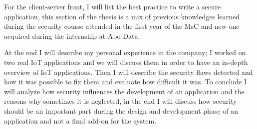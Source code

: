 	For the client-server front, I will list the best practice to write a secure application, this section of the thesis
	is a mix of previous knowledges learned during the security course attended in the first year of the MsC and new one
	acquired during the internship at Abo Data.\newline
	
	At the end I will describe my personal experience in the company; I worked on two real IoT applications and we will
	discuss them in order to have an in-depth overview of IoT applications.\newline
	Then I will describe the security flaws detected and how it was possible to fix them and evaluate how difficult it was.\newline
	To conclude I will analyze how security influences the development of an application and the reasons why sometimes it is neglected,
	in the end I will discuss how security should be an important part during the design and development phase of an application
	and not a final add-on for the system.\newline
	